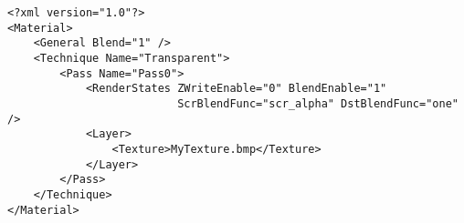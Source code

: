 \begin{lstlisting}[caption=Transparent/blended material]
<?xml version="1.0"?>
<Material>
    <General Blend="1" />
    <Technique Name="Transparent">
        <Pass Name="Pass0">
            <RenderStates ZWriteEnable="0" BlendEnable="1" 
                          ScrBlendFunc="scr_alpha" DstBlendFunc="one" />
            <Layer>
                <Texture>MyTexture.bmp</Texture>
            </Layer>
        </Pass>
    </Technique>
</Material>
\end{lstlisting}

